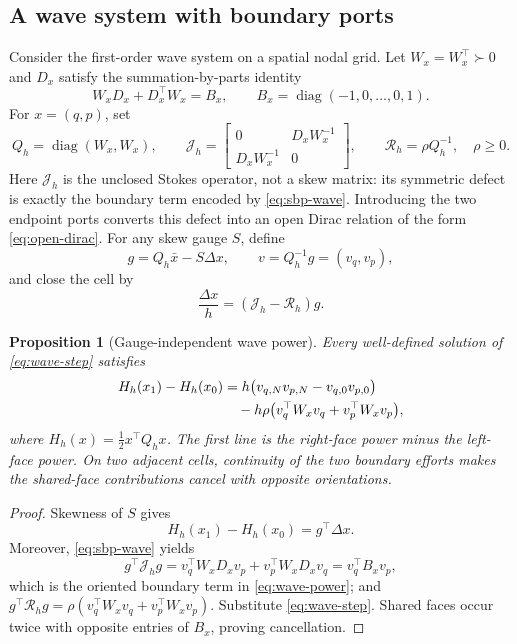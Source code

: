 \documentclass[11pt,a4paper]{article}
\newtheorem{proposition}[theorem]{Proposition}
\newcommand{\diag}{\operatorname{diag}}
\begin{document}
\subsection{A wave system with boundary ports}

Consider the first-order wave system on a spatial nodal grid.  Let
\(W_x=W_x^\top\succ0\) and \(D_x\) satisfy the summation-by-parts identity
\begin{equation}\label{eq:sbp-wave}
 W_xD_x+D_x^\top W_x=B_x,
 \qquad B_x=\diag(-1,0,\ldots,0,1).
\end{equation}
For \(x=(q,p)\), set
\begin{equation}\label{eq:wave-QJ}
 Q_h=\diag(W_x,W_x),\qquad
 \mathcal J_h=
 \begin{bmatrix}
 0&D_xW_x^{-1}\\ D_xW_x^{-1}&0
 \end{bmatrix},
 \qquad
 \mathcal R_h=\rho Q_h^{-1},\quad\rho\ge0.
\end{equation}
Here \(\mathcal J_h\) is the unclosed Stokes operator, not a skew matrix:
its symmetric defect is exactly the boundary term encoded by
\cref{eq:sbp-wave}.  Introducing the two endpoint ports converts this
defect into an open Dirac relation of the form \cref{eq:open-dirac}.
For any skew gauge \(S\), define
\begin{equation}\label{eq:wave-gauge-effort}
 g=Q_h\bar x-S\Delta x,
 \qquad v=Q_h^{-1}g=(v_q,v_p),
\end{equation}
and close the cell by
\begin{equation}\label{eq:wave-step}
 \frac{\Delta x}{h}=(\mathcal J_h-\mathcal R_h)g.
\end{equation}

\begin{proposition}[Gauge-independent wave power]
\label{prop:wave-power}
Every well-defined solution of \cref{eq:wave-step} satisfies
\begin{align}
 H_h(x_1)-H_h(x_0)
 &=h\bigl(v_{q,N}v_{p,N}-v_{q,0}v_{p,0}\bigr)\notag\\
 &\quad-h\rho
 \bigl(v_q^\top W_xv_q+v_p^\top W_xv_p\bigr),
 \label{eq:wave-power}
\end{align}
where \(H_h(x)=\tfrac12x^\top Q_hx\).  The first line is the right-face
power minus the left-face power.  On two adjacent cells, continuity of
the two boundary efforts makes the shared-face contributions cancel with
opposite orientations.
\end{proposition}

\begin{proof}
Skewness of \(S\) gives
\[
 H_h(x_1)-H_h(x_0)=g^\top\Delta x.
\]
Moreover, \cref{eq:sbp-wave} yields
\[
 g^\top\mathcal J_hg
 =v_q^\top W_xD_xv_p+v_p^\top W_xD_xv_q
 =v_q^\top B_xv_p,
\]
which is the oriented boundary term in \cref{eq:wave-power}; and
\(
 g^\top\mathcal R_hg
 =\rho(v_q^\top W_xv_q+v_p^\top W_xv_p)
\).
Substitute \cref{eq:wave-step}.  Shared faces occur twice with opposite
entries of \(B_x\), proving cancellation.
\end{proof}
\end{document}
